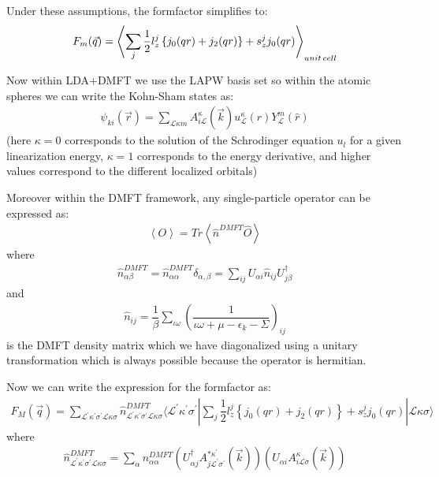 \documentclass[10pt]{ruthesis}
\begin{document}
{Under these assumptions, the formfactor simplifies to:
 \begin{align}
 F_{m}(\vec q)= \left\langle \sum_{j} \dfrac{1}{2}l^{j}_{z} \left \lbrace j_{0}(qr) +j_{2}(qr) \right \rbrace + s^{j}_{z} j_0(qr) \right\rangle _ {unit \hspace{0.5 mm} cell}
 \end{align}
 

 
 Now within LDA+DMFT we use the LAPW basis set so within the atomic spheres we can write the Kohn-Sham states as:
 \begin{align}
 \psi_{ki}(\vec{r})=\sum_{\mathcal{L}\kappa m} A_{i \mathcal{L}}^{\kappa}(\vec{k}) u_{\mathcal{L}}^{\kappa}(r) Y_{\mathcal{L}}^{m}(\hat{r})
 \end{align}
 (here $\kappa=0 $ corresponds to the solution of the Schrodinger equation $u_{l}$ for a given linearization energy, $\kappa=1$ corresponds to the energy derivative, and higher values correspond to the different localized orbitals)
 
 Moreover within the DMFT framework, any single-particle operator can be expressed as:
 \begin{align}
 \left\langle O \right\rangle = Tr \left\langle \hat{n}^{DMFT} \hat{O} \right\rangle
 \end{align}
where
\begin{align}
\hat{n}^{DMFT}_{\alpha \beta}=\hat{n}^{DMFT}_{\alpha \alpha} \delta_{\alpha,\beta}=\sum_{ij} U_{\alpha i}\hat{n}_{ij}U^{\dagger}_{j\beta}
\end{align}
and
\begin{align}
\hat{n}_{ij}=\dfrac{1}{\beta} \sum_{\iota \omega} \left( \dfrac{1}{\iota \omega +\mu -\epsilon_{k}-\Sigma} \right)_{ij}
\end{align}
is the DMFT density matrix which we have diagonalized using a unitary transformation which is always possible because the operator is hermitian. 

Now we can write the expression for the formfactor as:
\begin{align}
F_{M}(\vec{q})=\sum_{\mathcal{L}^{'}\kappa^{'}\sigma^{'} \mathcal{L}\kappa\sigma} \hat{n}^{DMFT}_{\mathcal{L}^{'}\kappa^{'}\sigma^{'} \mathcal{L}\kappa\sigma} \langle \mathcal{L}^{'}\kappa^{'}\sigma^{'} | \sum_{j} \dfrac{1}{2} l^{j}_{z} \left \lbrace j_{0}(qr) +j_{2}(qr) \right \rbrace + s^{j}_{z} j_0(qr) |\mathcal{L}\kappa\sigma \rangle
\end{align}
where 
\begin{align}
\hat{n}^{DMFT}_{\mathcal{L}^{'}\kappa^{'}\sigma^{'} \mathcal{L}\kappa\sigma}=\sum_{\alpha} {n}^{DMFT}_{\alpha \alpha} \left(U^{\dagger}_{\alpha j} A^{* \kappa^{'}}_{j \mathcal{L}^{'} \sigma^{'}}(\vec{k})\right)\left(U_{\alpha i} A^{ \kappa}_{i \mathcal{L}\sigma}(\vec{k})\right)
\end{align}

}
\end{document}
